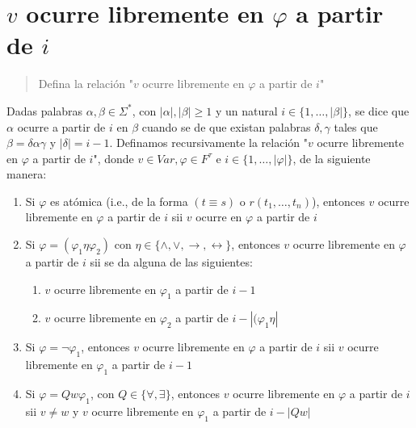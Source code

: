 \documentclass{article}
\begin{document}
\section{$v$ ocurre libremente en $\varphi$ a partir de $i$}
\begin{quote}
  Defina la relación "$v$ ocurre libremente en $\varphi$ a partir de $i$"
\end{quote}
Dadas palabras $\alpha,\beta\in\Sigma^*$, con $|\alpha|,|\beta|\geq 1$ y un natural $i\in\{1,\dots,|\beta|\}$, se dice que $\alpha$ ocurre a partir de $i$ en $\beta$ cuando se de que existan palabras $\delta,\gamma$ tales que $\beta=\delta\alpha\gamma$ y $|\delta|=i-1$.
\newline
Definamos recursivamente la relación "$v$ ocurre libremente en $\varphi$ a partir de $i$", donde $v\in Var,\varphi\in F^\tau$ e $i\in\{1,\dots,|\varphi|\}$, de la siguiente manera:
\begin{enumerate}
  \item Si $\varphi$ es atómica (i.e., de la forma $(t\equiv s)$ o $r(t_1,\dots,t_n)$), entonces $v$ ocurre libremente en $\varphi$ a partir de $i$ sii $v$ ocurre en $\varphi$ a partir de $i$
  \item Si $\varphi=(\varphi_1\eta\varphi_2)$ con $\eta\in\{\land,\lor,\to,\leftrightarrow\}$, entonces $v$ ocurre libremente en $\varphi$ a partir de $i$ sii se da alguna de las siguientes:
        \begin{enumerate}
          \item $v$ ocurre libremente en $\varphi_1$ a partir de $i-1$
          \item $v$ ocurre libremente en $\varphi_2$ a partir de $i-|(\varphi_1\eta|$
        \end{enumerate}
  \item Si $\varphi=\neg\varphi_1$, entonces $v$ ocurre libremente en $\varphi$ a partir de $i$ sii $v$ ocurre libremente en $\varphi_1$ a partir de $i-1$
  \item Si $\varphi=Qw\varphi_1$, con $Q\in\{\forall,\exists\}$, entonces $v$ ocurre libremente en $\varphi$ a partir de $i$ sii $v\neq w$ y $v$ ocurre libremente en $\varphi_1$ a partir de $i-|Qw|$
\end{enumerate}
\end{document}
